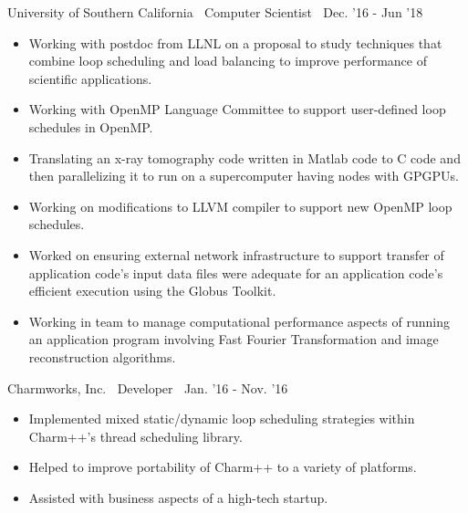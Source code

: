 {University of Southern California$\>$$\>$$\>$$\>$Computer Scientist$\>$$\>$$\>$$\>$Dec. '16 - Jun '18}
\vspace*{-0.0in} 
\begin{itemize}
\item Working with postdoc from LLNL on a proposal to study
techniques that combine loop scheduling and load balancing to improve
performance of scientific applications.
\item Working with OpenMP Language Committee to support user-defined loop schedules in OpenMP.
\item Translating an x-ray tomography code written in
Matlab code to C code and then parallelizing it to run on a supercomputer
having nodes with GPGPUs. 
\item Working on modifications to LLVM compiler to support new
OpenMP loop schedules. 
\item Worked on ensuring external network infrastructure to support transfer of application code's input data files were adequate
for an application code's efficient execution using the Globus Toolkit.
\item Working in team to manage computational performance aspects of running an application program involving Fast Fourier Transformation and image reconstruction algorithms. 
\end{itemize}

{Charmworks, Inc.$\>$$\>$$\>$$\>$Developer$\>$$\>$$\>$$\>$Jan. '16 - Nov. '16}
\vspace*{-0.0in}
\begin{itemize}
\item Implemented mixed static/dynamic loop scheduling
strategies within Charm++'s thread scheduling library.
\item Helped to improve portability of Charm++ to a variety of platforms. 
\item Assisted with business aspects of a high-tech startup. 
\end{itemize} 

